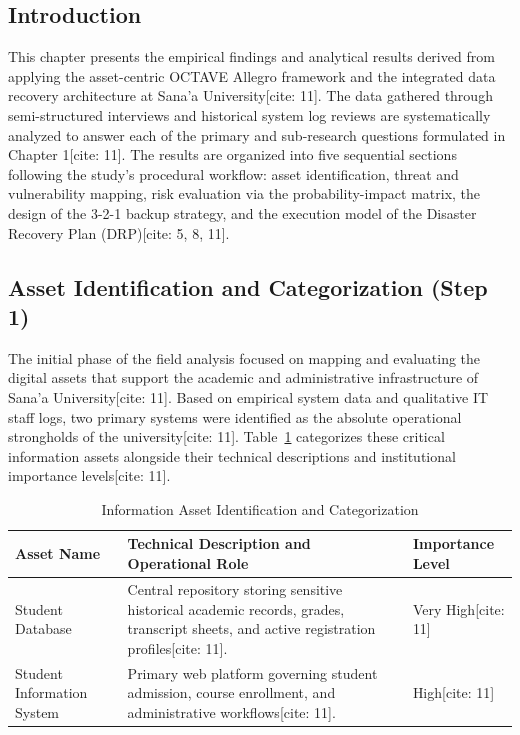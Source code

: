 \documentclass[journal,onecolumn,12pt,twoside]{IEEEtran}
\begin{document}
	\subsection{Introduction}
	\label{subsec:results_intro}
	This chapter presents the empirical findings and analytical results derived from applying the asset-centric OCTAVE Allegro framework and the integrated data recovery architecture at Sana'a University[cite: 11]. The data gathered through semi-structured interviews and historical system log reviews are systematically analyzed to answer each of the primary and sub-research questions formulated in Chapter 1[cite: 11]. The results are organized into five sequential sections following the study's procedural workflow: asset identification, threat and vulnerability mapping, risk evaluation via the probability-impact matrix, the design of the 3-2-1 backup strategy, and the execution model of the Disaster Recovery Plan (DRP)[cite: 5, 8, 11].
	
	\subsection{Asset Identification and Categorization (Step 1)}
	\label{subsec:results_step1}
	The initial phase of the field analysis focused on mapping and evaluating the digital assets that support the academic and administrative infrastructure of Sana'a University[cite: 11]. Based on empirical system data and qualitative IT staff logs, two primary systems were identified as the absolute operational strongholds of the university[cite: 11]. Table~\ref{tab:assets_identification} categorizes these critical information assets alongside their technical descriptions and institutional importance levels[cite: 11].
	
	\begin{table}[htbp]
		\caption{Information Asset Identification and Categorization}
		\label{tab:assets_identification}
		\centering
		\begin{tabular}{l p{7cm} l}
			\toprule
			\textbf{Asset Name} & \textbf{Technical Description and Operational Role} & \textbf{Importance Level} \\
			\midrule
			Student Database & Central repository storing sensitive historical academic records, grades, transcript sheets, and active registration profiles[cite: 11]. & Very High[cite: 11] \\
			\addlinespace
			Student Information System & Primary web platform governing student admission, course enrollment, and administrative workflows[cite: 11]. & High[cite: 11] \\
			\bottomrule
		\end{tabular}
	\end{table}
	
\end{document}
